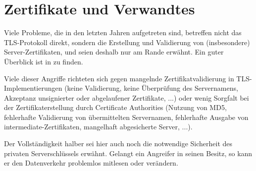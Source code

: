 \section{Zertifikate und Verwandtes}

Viele Probleme, die in den letzten Jahren aufgetreten sind, betreffen nicht das TLS-Protokoll direkt, sondern die Erstellung und Validierung von (insbesondere) Server-Zertifikaten, und seien deshalb nur am Rande erwähnt. Ein guter Überblick ist in \cite{meyer13} zu finden.

Viele dieser Angriffe richteten sich gegen mangelnde Zertifikatvalidierung in TLS-Implementierungen (keine Validierung, keine Überprüfung des Servernamens, Akzeptanz unsignierter oder abgelaufener Zertifikate, ...) oder wenig Sorgfalt bei der Zertifikaterstellung durch Certificate Authorities (Nutzung von MD5, fehlerhafte Validierung von übermittelten Servernamen, fehlerhafte Ausgabe von intermediate-Zertifikaten, mangelhaft abgesicherte Server, ...).

Der Vollständigkeit halber sei hier auch noch die notwendige Sicherheit des privaten Serverschlüssels erwähnt. Gelangt ein Angreifer in seinen Besitz, so kann er den Datenverkehr problemlos mitlesen oder verändern.